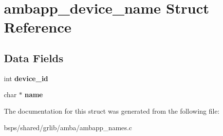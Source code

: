 \hypertarget{structambapp__device__name}{}\section{ambapp\+\_\+device\+\_\+name Struct Reference}
\label{structambapp__device__name}
\subsection*{Data Fields}
\begin{DoxyCompactItemize}
\item 
\mbox{\label{structambapp__device__name_af15a25a8b2219ccda8a9333716a3e685}} 
int {\bfseries device\+\_\+id}
\item 
\mbox{\label{structambapp__device__name_aa429547a16f1c74c034bdf094b645fa3}} 
char $\ast$ {\bfseries name}
\end{DoxyCompactItemize}


The documentation for this struct was generated from the following file\+:\begin{DoxyCompactItemize}
\item 
bsps/shared/grlib/amba/ambapp\+\_\+names.\+c\end{DoxyCompactItemize}
